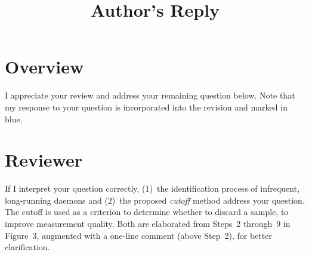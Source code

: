 \documentclass[10pt,letterpaper]{article}
\newenvironment{myindentpar}[1]%
{\begin{list}{}
         {\vspace{10pt}
					\setlength{\leftmargin}{#1}}
          \item[]
}
{\end{list}}
\newcommand{\rev}[1]{\begin{myindentpar}{.25in} {\em {\color{blue}{#1}}}\end{myindentpar}}
\begin{document}
\title{Author's Reply}
\author{}
\maketitle

\section*{Overview}\label{sec:overview}
I appreciate your review and address your remaining question below. 
Note that my response to your question is 
incorporated into the revision and marked in {\color{blue}blue}.


\clearpage
\section*{Reviewer}\label{sec:rev1}

\rev{
$<<$ Reviewer's comments to the author(s) $>>$

The manuscript is well revised.

However, I have a question how to estimate each daemon's influence as time.
The estimation is important for accuracy of your proposed method.

For acceptance, please clarify the estimation method and its validity.

}

If I interpret your question correctly,
(1)~the identification process of infrequent, long-running daemons 
and (2)~the proposed {\em cutoff} method address your question. 
The cutoff is used as a criterion to determine whether to discard a sample, to improve measurement quality. 
Both are elaborated from Steps~2 through~9 in Figure~3, augmented with a one-line comment (above Step~2), 
for better clarification.
\end{document}
